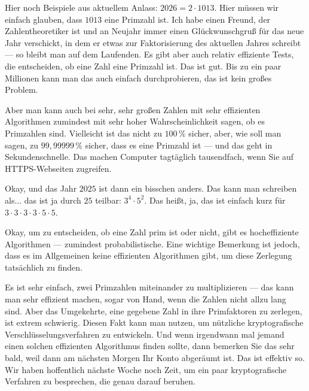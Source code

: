 \begin{spoken-clean}[00:58:16 - 01:00:35]
Hier noch Beispiele aus aktuellem Anlass: $2026 = 2 \cdot 1013$. Hier müssen wir einfach glauben, dass $1013$ eine Primzahl ist. Ich habe einen Freund, der Zahlentheoretiker ist und an Neujahr immer einen Glückwunschgruß für das neue Jahr verschickt, in dem er etwas zur Faktorisierung des aktuellen Jahres schreibt --- so bleibt man auf dem Laufenden. Es gibt aber auch relativ effiziente Tests, die entscheiden, ob eine Zahl eine Primzahl ist. Das ist gut. Bis zu ein paar Millionen kann man das auch einfach durchprobieren, das ist kein großes Problem.

Aber man kann auch bei sehr, sehr großen Zahlen mit sehr effizienten Algorithmen zumindest mit sehr hoher Wahrscheinlichkeit sagen, ob es Primzahlen sind. Vielleicht ist das nicht zu $100\,\%$ sicher, aber, wie soll man sagen, zu $99{,}99999\,\%$ sicher, dass es eine Primzahl ist --- und das geht in Sekundenschnelle. Das machen Computer tagtäglich tausendfach, wenn Sie auf HTTPS-Webseiten zugreifen.

Okay, und das Jahr $2025$ ist dann ein bisschen anders. Das kann man schreiben als... das ist ja durch $25$ teilbar: $3^4 \cdot 5^2$. Das heißt, ja, das ist einfach kurz für $3 \cdot 3 \cdot 3 \cdot 3 \cdot 5 \cdot 5$.
\end{spoken-clean}

\begin{math-stroke}
\end{math-stroke}

\begin{spoken-clean}[01:00:35 - 01:03:42]
Okay, um zu entscheiden, ob eine Zahl prim ist oder nicht, gibt es hocheffiziente Algorithmen --- zumindest probabilistische. Eine wichtige Bemerkung ist jedoch, dass es im Allgemeinen keine effizienten Algorithmen gibt, um diese Zerlegung tatsächlich zu finden.

Es ist sehr einfach, zwei Primzahlen miteinander zu multiplizieren --- das kann man sehr effizient machen, sogar von Hand, wenn die Zahlen nicht allzu lang sind. Aber das Umgekehrte, eine gegebene Zahl in ihre Primfaktoren zu zerlegen, ist extrem schwierig. Diesen Fakt kann man nutzen, um nützliche kryptografische Verschlüsselungsverfahren zu entwickeln. Und wenn irgendwann mal jemand einen solchen effizienten Algorithmus finden sollte, dann bemerken Sie das sehr bald, weil dann am nächsten Morgen Ihr Konto abgeräumt ist. Das ist effektiv so. Wir haben hoffentlich nächste Woche noch Zeit, um ein paar kryptografische Verfahren zu besprechen, die genau darauf beruhen.
\end{spoken-clean}

